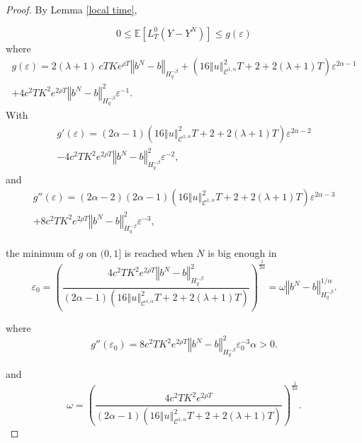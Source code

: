 \documentclass[12pt]{article}
\newcommand{\norme}[1]{\left\Vert #1\right\Vert}
\newcommand{\E}{\mathbb{E}}
\begin{document}
\begin{proof}
    By Lemma \ref{local time},
    
    \begin{equation*}
    0\leq\E\left[L^0_T(Y-Y^N)\right]\leq g(\varepsilon)
    \end{equation*}
    where \begin{multline*}
    g(\varepsilon) = 2(\lambda + 1)\ cT Ke^{\rho T}\norme{b^N-b}_{H^{-\beta}_{q}} + \left(16\norme{u}_{\mathcal{C}^{1,\alpha}}^2 T + 2 + 2(\lambda + 1)T\right) \varepsilon^{2\alpha-1}\\
    + 4c^2T K^2e^{2\rho T}\norme{b^N-b}_{H^{-\beta}_{q}}^2\varepsilon^{-1}.
    \end{multline*}    
    With \begin{multline*}
    g'(\varepsilon)=(2\alpha-1)\left(16\norme{u}_{\mathcal{C}^{1,\alpha}}^2 T + 2 + 2(\lambda + 1)T\right)\varepsilon^{2\alpha-2}\\-4c^2T K^2e^{2\rho T}\norme{b^N-b}_{H^{-\beta}_{q}}^2\varepsilon^{-2},
    \end{multline*}
    and 
    \begin{multline*}
    g''(\varepsilon)=(2\alpha-2)(2\alpha-1)\left(16\norme{u}_{\mathcal{C}^{1,\alpha}}^2 T + 2 + 2(\lambda + 1)T\right)\varepsilon^{2\alpha-3}\\+8c^2T K^2e^{2\rho T}\norme{b^N-b}_{H^{-\beta}_{q}}^2\varepsilon^{-3},\end{multline*}
    
    the minimum of $g$ on $(0,1]$ is reached when $N$ is big enough in \begin{equation*}
    \varepsilon_0=\left(\frac{4c^2T K^2e^{2\rho T}\norme{b^N-b}_{H^{-\beta}_{q}}^2}{(2\alpha-1)\left(16\norme{u}_{\mathcal{C}^{1,\alpha}}^2 T + 2 + 2(\lambda + 1)T\right)}\right)^{\frac{1}{2\alpha}}=\omega \norme{b^N-b}_{H^{-\beta}_{q}}^{1/\alpha}.
    \end{equation*}
    
    where 
    \begin{equation*}
    g''(\varepsilon_0)
    =8c^2T K^2e^{2\rho T}\norme{b^N-b}_{H^{-\beta}_{q}}^2\varepsilon_0^{-3}\alpha>0.
    \end{equation*}
    
    and \begin{equation*}
    \omega = \left(\frac{4c^2T K^2e^{2\rho T}}{(2\alpha-1)\left(16\norme{u}_{\mathcal{C}^{1,\alpha}}^2 T + 2 + 2(\lambda + 1)T\right)}\right)^{\frac{1}{2\alpha}}.
    \end{equation*}
    

\end{proof}
\end{document}
